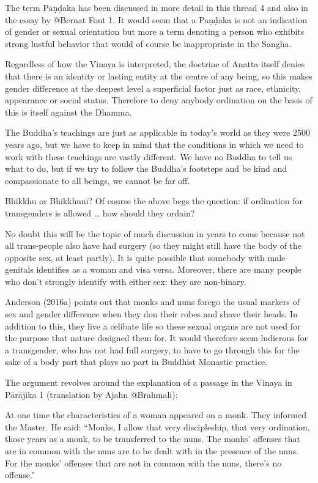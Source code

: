 The term Paṇḍaka has been discussed in more detail in this thread 4 and also in the essay by @Bernat Font 1. It would seem that a Paṇḍaka is not an indication of gender or sexual orientation but more a term denoting a person who exhibits strong lustful behavior that would of course be inappropriate in the Sangha.

Regardless of how the Vinaya is interpreted, the doctrine of Anatta itself denies that there is an identity or lasting entity at the centre of any being, so this makes gender difference at the deepest level a superficial factor just as race, ethnicity, appearance or social status. Therefore to deny anybody ordination on the basis of this is itself against the Dhamma.

The Buddha’s teachings are just as applicable in today’s world as they were 2500 years ago, but we have to keep in mind that the conditions in which we need to work with these teachings are vastly different. We have no Buddha to tell us what to do, but if we try to follow the Buddha’s footsteps and be kind and compassionate to all beings, we cannot be far off.

Bhikkhu or Bhikkhunī?
Of course the above begs the question: if ordination for transgenders is allowed … how should they ordain?

No doubt this will be the topic of much discussion in years to come because not all trans-people also have had surgery (so they might still have the body of the opposite sex, at least partly). It is quite possible that somebody with male genitals identifies as a woman and visa versa. Moreover, there are many people who don’t strongly identify with either sex: they are non-binary.

Anderson (2016a) points out that monks and nuns forego the usual markers of sex and gender difference when they don their robes and shave their heads. In addition to this, they live a celibate life so these sexual organs are not used for the purpose that nature designed them for. It would therefore seem ludicrous for a transgender, who has not had full surgery, to have to go through this for the sake of a body part that plays no part in Buddhist Monastic practice.

The argument revolves around the explanation of a passage in the Vinaya in Pārājika 1 (translation by Ajahn @Brahmali):

At one time the characteristics of a woman appeared on a monk. They informed the Master. He said: “Monks, I allow that very discipleship, that very ordination, those years as a monk, to be transferred to the nuns. The monks’ offenses that are in common with the nuns are to be dealt with in the presence of the nuns. For the monks’ offenses that are not in common with the nuns, there’s no offense.”

